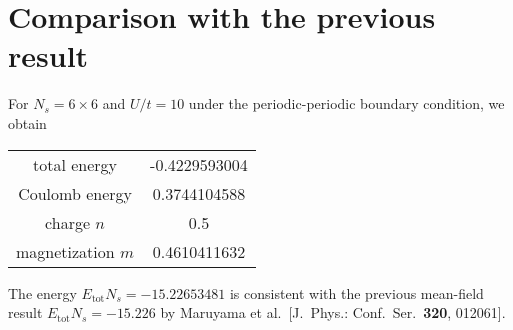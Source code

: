 \documentclass[a4paper,11pt]{article}
\begin{document}
\section{Comparison with the previous result}

For $N_s=6\times 6$ and $U/t=10$
under the periodic-periodic boundary condition, we obtain
\begin{table}[h!]
\centering
\begin{tabular}{c|c}
\hline
 total energy & -0.4229593004 \\
 Coulomb energy & 0.3744104588 \\
 charge $n$ & 0.5 \\
 magnetization $m$ & 0.4610411632 \\
\hline
\end{tabular}
\end{table}

The energy $E_{\mathrm{tot}}N_s = -15.22653481$ is consistent with the previous mean-field result
$E_{\mathrm{tot}}N_s = -15.226$ by Maruyama et al.\
[J.\ Phys.: Conf.\ Ser.\ {\bf 320}, 012061].


\end{document}

